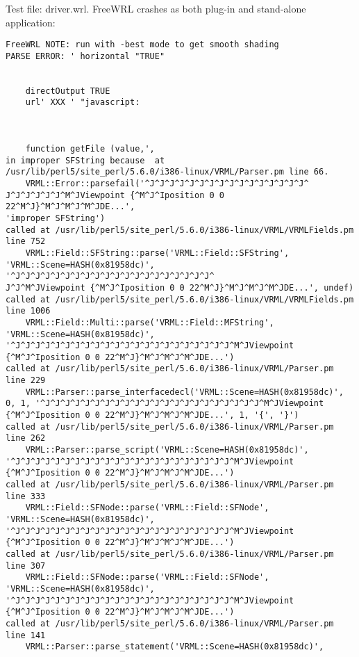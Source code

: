 \subsubsection{\FSG}
Test file: driver.wrl.\newline
FreeWRL crashes as both plug-in and stand-alone application:
\begin{verbatim}
FreeWRL NOTE: run with -best mode to get smooth shading
PARSE ERROR: ' horizontal "TRUE"
	
	
	directOutput TRUE
	url' XXX ' "javascript: 
	
	
	
	function getFile (value,',
in improper SFString because  at
/usr/lib/perl5/site_perl/5.6.0/i386-linux/VRML/Parser.pm line 66.
	VRML::Error::parsefail('^J^J^J^J^J^J^J^J^J^J^J^J^J^J^J^J^
J^J^J^J^J^J^M^JViewpoint {^M^J^Iposition 0 0 22^M^J}^M^J^M^J^M^JDE...',
'improper SFString')
called at /usr/lib/perl5/site_perl/5.6.0/i386-linux/VRML/VRMLFields.pm
line 752
	VRML::Field::SFString::parse('VRML::Field::SFString',
'VRML::Scene=HASH(0x81958dc)', '^J^J^J^J^J^J^J^J^J^J^J^J^J^J^J^J^J^J^J^J^
J^J^M^JViewpoint {^M^J^Iposition 0 0 22^M^J}^M^J^M^J^M^JDE...', undef)
called at /usr/lib/perl5/site_perl/5.6.0/i386-linux/VRML/VRMLFields.pm
line 1006
	VRML::Field::Multi::parse('VRML::Field::MFString',
'VRML::Scene=HASH(0x81958dc)',
'^J^J^J^J^J^J^J^J^J^J^J^J^J^J^J^J^J^J^J^J^J^J^M^JViewpoint
{^M^J^Iposition 0 0 22^M^J}^M^J^M^J^M^JDE...')
called at /usr/lib/perl5/site_perl/5.6.0/i386-linux/VRML/Parser.pm
line 229
	VRML::Parser::parse_interfacedecl('VRML::Scene=HASH(0x81958dc)',
0, 1, '^J^J^J^J^J^J^J^J^J^J^J^J^J^J^J^J^J^J^J^J^J^J^M^JViewpoint
{^M^J^Iposition 0 0 22^M^J}^M^J^M^J^M^JDE...', 1, '{', '}')
called at /usr/lib/perl5/site_perl/5.6.0/i386-linux/VRML/Parser.pm
line 262
	VRML::Parser::parse_script('VRML::Scene=HASH(0x81958dc)',
'^J^J^J^J^J^J^J^J^J^J^J^J^J^J^J^J^J^J^J^J^J^J^M^JViewpoint
{^M^J^Iposition 0 0 22^M^J}^M^J^M^J^M^JDE...')
called at /usr/lib/perl5/site_perl/5.6.0/i386-linux/VRML/Parser.pm
line 333
	VRML::Field::SFNode::parse('VRML::Field::SFNode',
'VRML::Scene=HASH(0x81958dc)',
'^J^J^J^J^J^J^J^J^J^J^J^J^J^J^J^J^J^J^J^J^J^J^M^JViewpoint
{^M^J^Iposition 0 0 22^M^J}^M^J^M^J^M^JDE...')
called at /usr/lib/perl5/site_perl/5.6.0/i386-linux/VRML/Parser.pm
line 307
	VRML::Field::SFNode::parse('VRML::Field::SFNode',
'VRML::Scene=HASH(0x81958dc)',
'^J^J^J^J^J^J^J^J^J^J^J^J^J^J^J^J^J^J^J^J^J^J^M^JViewpoint
{^M^J^Iposition 0 0 22^M^J}^M^J^M^J^M^JDE...')
called at /usr/lib/perl5/site_perl/5.6.0/i386-linux/VRML/Parser.pm
line 141
	VRML::Parser::parse_statement('VRML::Scene=HASH(0x81958dc)',

\end{verbatim}
